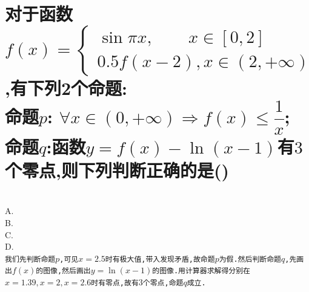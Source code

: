 \documentclass{article}
\newcommand{\1}{\underline{\makebox[1cm]{}}}
\newcommand{\2}{\underline{\makebox[2cm]{}}}
\newcommand{\3}{\underline{\makebox[3cm]{}}}
\newcommand{\4}{\underline{\makebox[4cm]{}}}
\newcommand{\lge}{\large \texttt}
\newlength{\la}
\begin{document}
\section{对于函数$f(x)=\begin{cases}\sin\pi x,\quad \quad x\in [0,2]\\0.5f(x-2),x\in (2,+\infty)\end{cases}$,有下列2个命题:\\命题$p$: $\forall x\in (0,+\infty)\Rightarrow f(x)\leq \dfrac{1}{x}$;\\命题$q$:函数$y=f(x)-\ln(x-1)$有$3$个零点,则下列判断正确的是(\quad \quad)}
\quad
\Large{\\A.\\ B.\\ C.\\ D.}
\\ \lge{我们先判断命题$p$,可见$x=2.5$时有极大值,带入发现矛盾,故命题$p$为假.然后判断命题$q$,先画出$f(x)$的图像,然后画出$y=\ln(x-1)$的图像.用计算器求解得分别在$x=1.39,x=2,x=2.6$时有零点,故有$3$个零点,命题$q$成立.}
\end{document}

